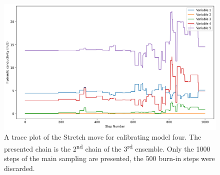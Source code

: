 \begin{figure}[H]
\centering
\includegraphics[width=\textwidth]{Figures/appendix_figs/logbook3_trace_plot.png}
\caption{A trace plot of the Stretch move for calibrating model four. The presented chain is the 2\textsuperscript{nd} chain of the 3\textsuperscript{rd}  ensemble. Only the 1000 steps of the main sampling are presented, the 500 burn-in steps were discarded. }\label{fig_logbook_3_trace_plot_Stretch}
\end{figure}